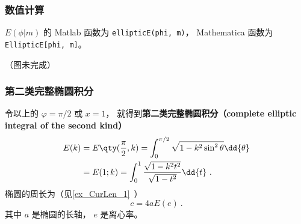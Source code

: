 \subsubsection{数值计算}
$E(\phi | m)$ 的 Matlab 函数为 \verb|ellipticE(phi, m)|， %
Mathematica 函数为 \verb|EllipticE[phi, m]|。

（图未完成）


\subsubsection{第二类完整椭圆积分}
令以上的 $\varphi = \pi/2$ 或 $x = 1$， 就得到\textbf{第二类完整椭圆积分（complete elliptic integral of the second kind）}
\begin{equation}
\begin{aligned}
E(k) &= E\qty(\frac{\pi}{2}, k) = \int_0^{\pi/2} \sqrt{1 - k^2\sin^2\theta} \dd{\theta}\\
&= E(1; k) =  \int_0^1 \frac{\sqrt{1 - k^2 t^2}}{\sqrt{1 - t^2}} \dd{t}~.
\end{aligned}
\end{equation}
椭圆的周长为（见\autoref{ex_CurLen_1}~）
\begin{equation}
c = 4aE(e)~.
\end{equation}
其中 $a$ 是椭圆的长轴， $e$ 是离心率。
